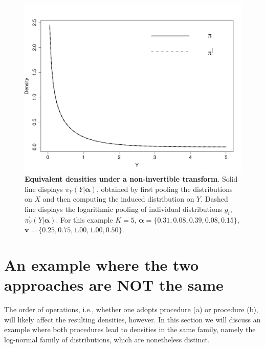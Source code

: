 \documentclass[a4paper, notitlepage, 10pt]{article}
\begin{document}
\begin{figure}[!ht]
\centering
\includegraphics[scale=0.5]{figures/normal_square_example.pdf}
\caption{\textbf{Equivalent densities under a non-invertible transform}. Solid line displays $\pi_Y(Y | \boldsymbol\alpha)$, obtained by first pooling the distributions on $X$ and then computing the induced distribution on $Y$.
Dashed line displays the logarithmic pooling of individual distributions $g_{i}$, $\pi_Y^{\prime}(Y | \boldsymbol\alpha)$.
For this example $K=5$, $\boldsymbol \alpha = \{0.31, 0.08, 0.39, 0.08, 0.15 \} $, $\boldsymbol v = \{ 0.25, 0.75, 1.00, 1.00, 0.50 \}$.
}
\label{fig:normal_square_example}
\end{figure}

\newpage
\section*{An example where the two approaches are \textbf{NOT} the same}

The order of operations, i.e., whether one adopts procedure (a) or procedure (b), will likely affect the resulting densities, however.
In this section we will discuss an example where both procedures lead to densities in the same family, namely the log-normal family of distributions, which are nonetheless distinct.
\end{document}
